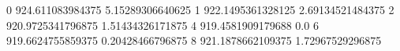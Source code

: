 0 924.611083984375 5.15289306640625
1 922.1495361328125 2.69134521484375
2 920.9725341796875 1.51434326171875
4 919.4581909179688 0.0
6 919.6624755859375 0.20428466796875
8 921.1878662109375 1.72967529296875
